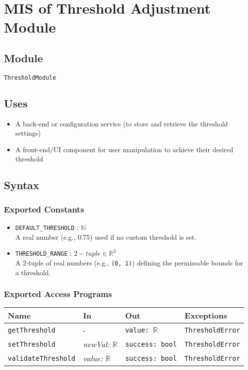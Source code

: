 \documentclass[12pt, titlepage]{article}
\begin{document}
\section{MIS of Threshold Adjustment Module} \label{mThreshold} %

\subsection{Module}

\texttt{ThresholdModule}

\subsection{Uses}

\begin{itemize}
    \item A back-end or configuration service (to store and retrieve the threshold settings)
    \item A front-end/UI component for user manipulation to achieve their desired threshold
\end{itemize}

\subsection{Syntax}

\subsubsection{Exported Constants}

\begin{itemize}
    \item \texttt{DEFAULT\_THRESHOLD} :  $\mathbb{N}$ \\
    A real number (e.g., 0.75) used if no custom threshold is set.
    \item \texttt{THRESHOLD\_RANGE} : $2-tuple \in \mathbb{R}^ 2 $ \\
    A 2-tuple of real numbers  (e.g., \texttt{(0, 1)}) defining the permissable bounds for a threshold.
\end{itemize}

\subsubsection{Exported Access Programs}

\begin{center}
\begin{tabular}{p{3.5cm} p{3.8cm} p{3cm} p{2.5cm}}
\hline
\textbf{Name} & \textbf{In} & \textbf{Out} & \textbf{Exceptions} \\
\hline
\texttt{getThreshold} & - & \texttt{value: $\mathbb{R}$} & \texttt{ThresholdError} \\
\texttt{setThreshold} & \textit{newVal: $\mathbb{R}$} & \texttt{success: bool} & \texttt{ThresholdError} \\
\texttt{validateThreshold} & \textit{value: $\mathbb{R}$} & \texttt{success: bool} & \texttt{ThresholdError} \\
\hline
\end{tabular}
\end{center}
\end{document}
